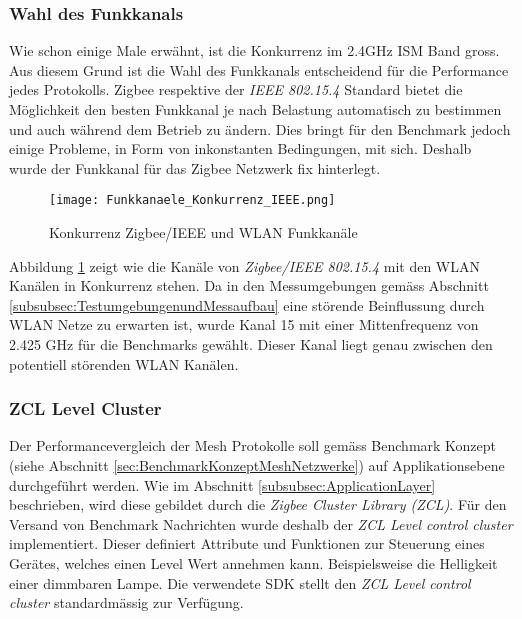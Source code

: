 \subsubsection{Wahl des Funkkanals}\label{subsubsec:FunkkanalWahlim2.4GHzISMBand}
Wie schon einige Male erwähnt, ist die Konkurrenz im 2.4GHz ISM Band gross.
Aus diesem Grund ist die Wahl des Funkkanals entscheidend für die Performance jedes Protokolls.
Zigbee respektive der \textit{IEEE 802.15.4} Standard bietet die Möglichkeit den besten Funkkanal je nach Belastung automatisch zu bestimmen und auch während dem Betrieb zu ändern.
Dies bringt für den Benchmark jedoch einige Probleme, in Form von inkonstanten Bedingungen, mit sich.
Deshalb wurde der Funkkanal für das Zigbee Netzwerk fix hinterlegt.

\begin{figure}[h]
	\centering
	\texttt{[image: Funkkanaele\_Konkurrenz\_IEEE.png]}
	\caption{Konkurrenz Zigbee\slash IEEE und WLAN Funkkanäle \cite{markus_krause_rainer_konrad_drahtlose_2014}}
	\label{fig:ZigbeeKonkurrenzIEEEundWLANFunkkanaele}
\end{figure}

Abbildung \ref{fig:ZigbeeKonkurrenzIEEEundWLANFunkkanaele} zeigt wie die Kanäle von \textit{Zigbee/IEEE 802.15.4} mit den WLAN Kanälen in Konkurrenz stehen.
Da in den Messumgebungen gemäss Abschnitt \ref{subsubsec:TestumgebungenundMessaufbau} eine störende Beinflussung durch WLAN Netze zu erwarten ist, wurde Kanal 15 mit einer Mittenfrequenz von 2.425 GHz für die Benchmarks gewählt.
Dieser Kanal liegt genau zwischen den potentiell störenden WLAN Kanälen.


\subsubsection{ZCL Level Cluster}\label{subsubsec:ZCLLevelCluster}
Der Performancevergleich der Mesh Protokolle soll gemäss Benchmark Konzept (siehe Abschnitt \ref{sec:BenchmarkKonzeptMeshNetzwerke}) auf Applikationsebene durchgeführt werden.
Wie im Abschnitt \ref{subsubsec:ApplicationLayer} beschrieben, wird diese gebildet durch die \textit{Zigbee Cluster Library (ZCL)}.
Für den Versand von Benchmark Nachrichten wurde deshalb der \textit{ZCL Level control cluster} implementiert.
Dieser definiert Attribute und Funktionen zur Steuerung eines Gerätes, welches einen Level Wert annehmen kann.
Beispielsweise die Helligkeit einer dimmbaren Lampe.
Die verwendete SDK stellt den \textit{ZCL Level control cluster} standardmässig zur Verfügung.\cite{the_zigbee_alliance_zigbee_2016}


